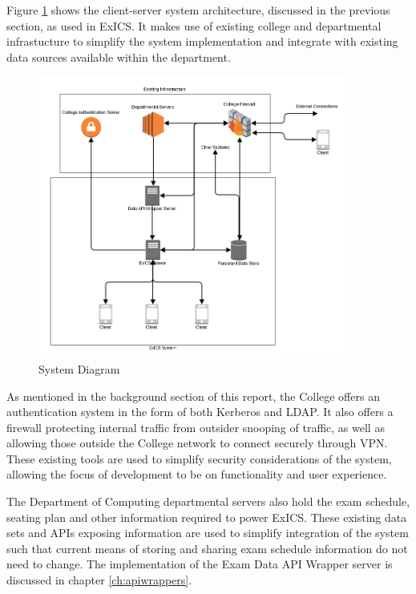 \FloatBarrier

Figure \ref{fig:system_diagram} shows the client-server system architecture, discussed in the previous section, as used in ExICS.  It makes use of existing college and departmental infrastucture to simplify the system implementation and integrate with existing data sources available within the department.

\begin{figure}[!htbp]
	\centering
	\includegraphics[width=0.9\textwidth]{"System Diagram/exics_system_diagram"}
	\caption{System Diagram}
	\label{fig:system_diagram}
\end{figure}

As mentioned in the background section of this report, the College offers an authentication system in the form of both Kerberos and LDAP.  It also offers a firewall protecting internal traffic from outsider snooping of traffic, as well as allowing those outside the College network to connect securely through VPN.  These existing tools are used to simplify security considerations of the system, allowing the focus of development to be on functionality and user experience.

The Department of Computing departmental servers also hold the exam schedule, seating plan and other information required to power ExICS.  These existing data sets and APIs exposing information are used to simplify integration of the system such that current means of storing and sharing exam schedule information do not need to change.  The implementation of the Exam Data API Wrapper server is discussed in chapter \ref{ch:apiwrappers}.

